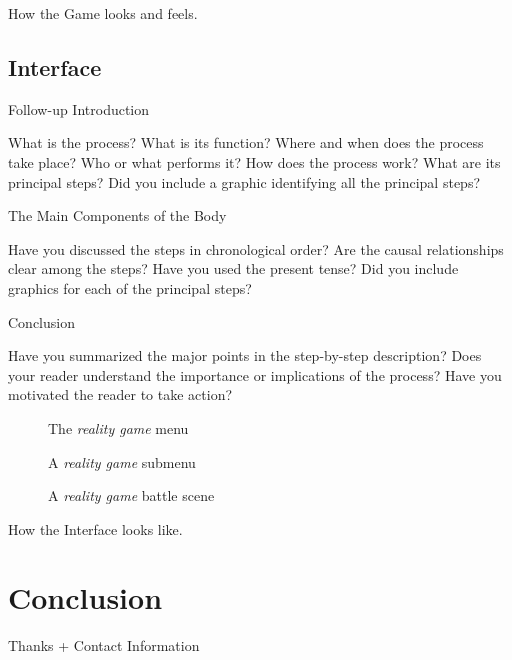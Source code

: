 How the Game looks and feels.

\section{Interface}

Follow-up Introduction

What is the process?
What is its function?
Where and when does the process take place?
Who or what performs it?   
How does the process work?
What are its principal steps? 
Did you include a graphic identifying all the principal steps? 

 
The Main Components of the Body  
 
Have you discussed the steps in chronological order?
Are the causal relationships clear among the steps?  
Have you used the present tense?  
Did you include graphics for each of the principal steps? 

 
Conclusion

Have you summarized the major points in the step-by-step description?   
 Does your reader understand the importance or implications of the process?
Have you motivated the reader to take action?

\begin{figure}[!ht]
\begin{center}
{%
\setlength{\fboxsep}{2pt}%
\setlength{\fboxrule}{1pt}%
%
}%
\end{center}
\caption[The \emph{\pokeT{} reality game} menu]{The \emph{\poke{} reality game} menu}
\end{figure}

\begin{figure}[!ht]
\begin{center}
{%
\setlength{\fboxsep}{2pt}%
\setlength{\fboxrule}{1pt}%
%
}%
\end{center}
\caption[A \emph{\pokeT{} reality game} submenu]{A \emph{\poke{} reality game} submenu}
\end{figure}

\begin{figure}[!ht]
\begin{center}
{%
\setlength{\fboxsep}{2pt}%
\setlength{\fboxrule}{1pt}%
%
}%
\end{center}
\caption[A \emph{\pokeT{} reality game} battle scene]{A \emph{\poke{} reality game} battle scene}
\end{figure}

How the Interface looks like.

\chapter{Conclusion}

Thanks + Contact Information


